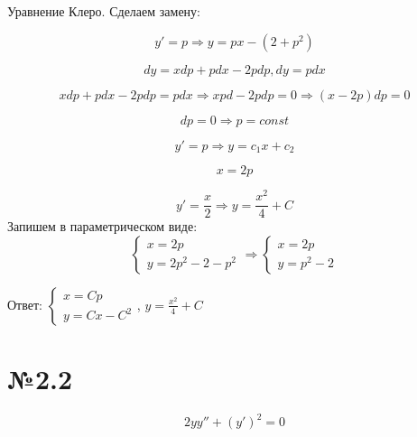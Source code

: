 \documentclass{article}
\begin{document}
Уравнение Клеро. Сделаем замену:

\begin{equation*}
    y' = p \Rightarrow  y = px - (2 + p^2)
\end{equation*}

\begin{equation*}
    dy = xdp + pdx - 2pdp,  dy = pdx
\end{equation*}

\begin{equation*}
    xdp +pdx - 2pdp = pdx \Rightarrow xpd - 2pdp = 0 \Rightarrow (x - 2p) dp = 0
\end{equation*}

\begin{equation*}
    dp = 0 \Rightarrow  p = const
\end{equation*}

\begin{equation*}
    y' = p \Rightarrow y = c_1x + c_2
\end{equation*}

\begin{equation*}
    x = 2p
\end{equation*}

\begin{equation*}
    y' = \frac{x}{2} \Rightarrow y = \frac{x^2}{4} + C
\end{equation*}
Запишем в параметрическом виде:
\begin{equation*}
    \begin{cases}
    x = 2p \\
    y = 2p^2 - 2 - p^2
    \end{cases}
    \Rightarrow
    \begin{cases}
    x = 2p \\
    y = p^2 - 2
    \end{cases}
\end{equation*}

Ответ: $\begin{cases}
    x = Cp \\
    y = Cx - C^2
    \end{cases}$,
    $y = \frac{x^2}{4} + C$

\section*{№2.2}
\begin{equation*}
    2yy'' + (y')^2 = 0
\end{equation*}
\end{document}

